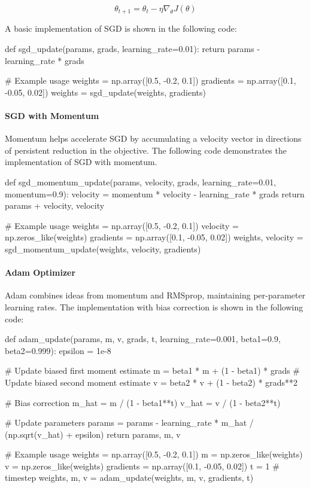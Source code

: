 \[ \theta_{t+1} = \theta_t - \eta \nabla_\theta J(\theta) \]

A basic implementation of SGD is shown in the following code:


\begin{pythoncode}
def sgd_update(params, grads, learning_rate=0.01):
    return params - learning_rate * grads

# Example usage
weights = np.array([0.5, -0.2, 0.1])
gradients = np.array([0.1, -0.05, 0.02])
weights = sgd_update(weights, gradients)
\end{pythoncode}

\paragraph{SGD with Momentum}
Momentum helps accelerate SGD by accumulating a velocity vector in directions of persistent reduction in the objective. The following code demonstrates the implementation of SGD with momentum.

\begin{pythoncode}
def sgd_momentum_update(params, velocity, grads, 
                       learning_rate=0.01, momentum=0.9):
    velocity = momentum * velocity - learning_rate * grads
    return params + velocity, velocity

# Example usage
weights = np.array([0.5, -0.2, 0.1])
velocity = np.zeros_like(weights)
gradients = np.array([0.1, -0.05, 0.02])
weights, velocity = sgd_momentum_update(weights, velocity, gradients)
\end{pythoncode}

\paragraph{Adam Optimizer}
Adam combines ideas from momentum and RMSprop, maintaining per-parameter learning rates. The implementation with bias correction is shown in the following code:

\begin{pythoncode}
def adam_update(params, m, v, grads, t, 
                learning_rate=0.001, beta1=0.9, beta2=0.999):
    epsilon = 1e-8
    
    # Update biased first moment estimate
    m = beta1 * m + (1 - beta1) * grads
    # Update biased second moment estimate
    v = beta2 * v + (1 - beta2) * grads**2
    
    # Bias correction
    m_hat = m / (1 - beta1**t)
    v_hat = v / (1 - beta2**t)
    
    # Update parameters
    params = params - learning_rate * m_hat / (np.sqrt(v_hat) + epsilon)
    return params, m, v

# Example usage
weights = np.array([0.5, -0.2, 0.1])
m = np.zeros_like(weights)
v = np.zeros_like(weights)
gradients = np.array([0.1, -0.05, 0.02])
t = 1  # timestep
weights, m, v = adam_update(weights, m, v, gradients, t)
\end{pythoncode}

